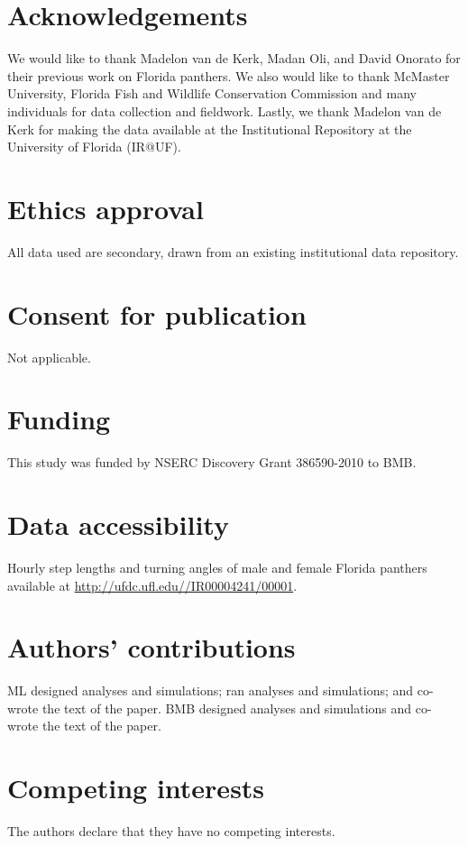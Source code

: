 \documentclass{bmcart}
\begin{document}

\begin{backmatter}

\section*{Acknowledgements}

We would like to thank Madelon van de Kerk, Madan Oli, and David Onorato for their previous work on Florida panthers. We also would like to thank McMaster University, Florida Fish and Wildlife Conservation Commission and many individuals for data collection and fieldwork. Lastly, we thank Madelon van de Kerk for making the data available at the Institutional Repository at the University of Florida (IR@UF).

\section*{Ethics approval}

All data used are secondary, drawn from an existing institutional
data repository.

\section*{Consent for publication}

Not applicable.
  
\section*{Funding}

This study was funded by NSERC Discovery Grant 386590-2010 to BMB.

\section*{Data accessibility}
Hourly step lengths and turning angles of male and female Florida panthers available at \url{http://ufdc.ufl.edu//IR00004241/00001}.

\section*{Authors' contributions}
ML designed analyses and simulations; ran analyses and simulations; and co-wrote the text of the paper.  BMB designed analyses and simulations and co-wrote the text of the paper.

\section*{Competing interests}
The authors declare that they have no competing interests.

\end{backmatter}
\end{document}
